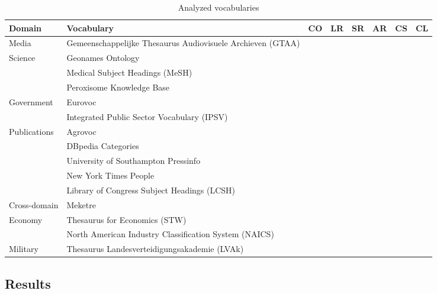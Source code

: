 \begin{table}[h]
\caption{Analyzed vocabularies}
\begin{tabular}{|p{2cm}|p{6cm}|p{1.5cm}|p{.8cm}|p{.8cm}|p{.8cm}|p{.8cm}|p{.8cm}|}
\hline
\textbf{Domain} & \textbf{Vocabulary} & \textbf{CO} & \textbf{LR} & \textbf{SR} & \textbf{AR} & \textbf{CS} & \textbf{CL}\\
\hline
Media & Gemeenschappelijke Thesaurus Audiovisuele Archieven (GTAA) & & & & & & \\
\hline
Science & Geonames Ontology &&&&&& \\
\hline
& Medical Subject Headings (MeSH) &&&&&& \\
\hline
& Peroxisome Knowledge Base &&&&&& \\
\hline
Government & Eurovoc &&&&&& \\
\hline
& Integrated Public Sector Vocabulary (IPSV) &&&&&& \\
\hline
Publications & Agrovoc &&&&&& \\
\hline
& DBpedia Categories &&&&&& \\
\hline
& University of Southampton Pressinfo &&&&&& \\
\hline
& New York Times People &&&&&& \\
\hline
& Library of Congress Subject Headings (LCSH) &&&&&& \\
\hline
Cross-domain & Meketre &&&&&& \\
\hline
Economy & Thesaurus for Economics (STW) &&&&&& \\
\hline
& North American Industry Classification System (NAICS) &&&&&& \\
\hline
Military & Thesaurus Landesverteidigungsakademie (LVAk) &&&&&&
\\
\hline
\end{tabular}
\label{vocabs}
\end{table}


\subsection{Results}


